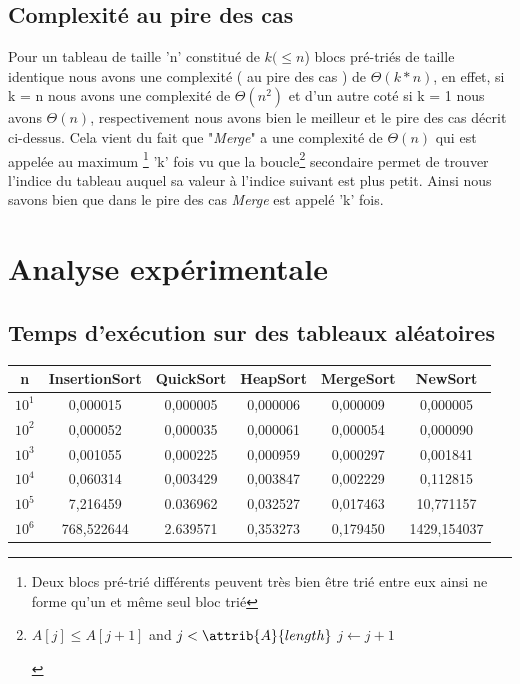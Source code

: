 \documentclass[a4paper, 11pt, oneside]{article}
\begin{document}
\subsection{Complexité au pire des cas}
Pour un tableau de taille 'n' constitué de $k(\leq n$) blocs pré-triés de taille identique nous avons une complexité ( au pire des cas ) de $\Theta(k*n)$, en effet, si k = n nous avons une complexité de $\Theta(n^{2})$ et d'un autre coté si k = 1 nous avons $\Theta(n)$, respectivement nous avons bien le meilleur et le pire des cas décrit ci-dessus. Cela vient du fait que "\textit{Merge}" a une complexité de $\Theta(n)$ qui est appelée au maximum \footnote{Deux blocs pré-trié différents peuvent très bien être trié entre eux ainsi ne forme qu'un et même seul bloc trié} 'k' fois vu que la boucle\footnote{\begin{codebox}
\li \While $A[j] \leq A[j+1]$ and $j < \attrib{A}{length}$
\li \Do
$j \gets j + 1$
\End
\end{codebox} }
secondaire permet de trouver l'indice du tableau auquel sa valeur à l'indice suivant est plus petit. Ainsi nous savons bien que dans le pire des cas \textit{Merge} est appelé 'k' fois.

\newpage

\section{Analyse expérimentale}
\subsection{Temps d'exécution sur des tableaux aléatoires}

\begin{table}[htb]
\begin{tabular}{cccccc}
\hline

n   & InsertionSort & QuickSort & HeapSort & MergeSort & NewSort \\ \hline
$10^{1}$ & 0,000015      & 0,000005  & 0,000006         & 0,000009          & 0,000005        \\
$10^{2}$ & 0,000052      & 0,000035  & 0,000061         & 0,000054          & 0,000090        \\
$10^{3}$ & 0,001055      & 0,000225  & 0,000959         & 0,000297          & 0,001841        \\
$10^{4}$ & 0,060314      & 0,003429  & 0,003847         & 0,002229          & 0,112815        \\
$10^{5}$ & 7,216459      & 0.036962  & 0,032527         & 0,017463           & 10,771157        \\
$10^{6}$ & 768,522644    & 2.639571  & 0,353273         & 0,179450          & 1429,154037
        
\end{tabular}
\end{table}
\end{document}
